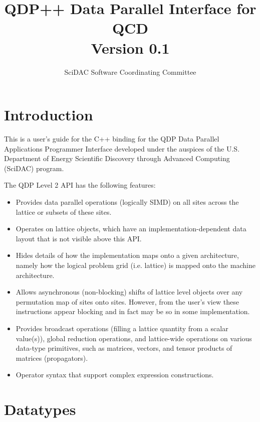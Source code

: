 \documentclass[12pt,letterpaper]{article}
\newcommand{\cpp}{C++}
\begin{document}
\title{
   QDP++ Data Parallel Interface for QCD  \\{\large Version 0.1}
}
\author{ SciDAC Software Coordinating Committee}

\maketitle
\section{Introduction}
This is a user's guide for the \cpp{} binding for the QDP Data Parallel
Applications Programmer Interface developed under the auspices of the
U.S. Department of Energy Scientific Discovery through Advanced
Computing (SciDAC) program.

The QDP Level 2 API has the following features:
\begin{itemize}
\item Provides data parallel operations (logically SIMD) on all sites
across the lattice or subsets of these sites.
\item Operates on lattice objects, which have an
implementation-dependent data layout that is not visible above this
API.
\item Hides details of how the implementation maps onto a given
architecture, namely how the logical problem grid (i.e. lattice) is
mapped onto the machine architecture.
\item Allows asynchronous (non-blocking) shifts of lattice level
objects over any permutation map of sites onto sites. However, from
the user's view these instructions appear blocking and in fact may be
so in some implementation.
\item Provides broadcast operations (filling a lattice quantity from a
scalar value(s)), global reduction operations, and lattice-wide
operations on various data-type primitives, such as matrices, vectors,
and tensor products of matrices (propagators).
\item
Operator syntax that support complex expression constructions.
\end{itemize}

\section{Datatypes}
\label{sec.datatypes}
\end{document}
